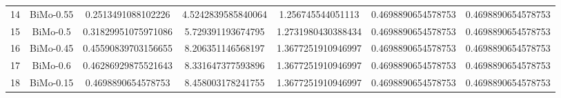 \documentclass[a4paper,10pt]{article}
\begin{document}
\begin{landscape}
\begin{table}[!htp]
\begin{tabular}{ccccccc}
14&BiMo-0.55&0.2513491088102226&4.5242839585840064&1.256745544051113&0.4698890654578753&0.4698890654578753\\
15&BiMo-0.5&0.31829951075971086&5.729391193674795&1.2731980430388434&0.4698890654578753&0.4698890654578753\\
16&BiMo-0.45&0.45590839703156655&8.206351146568197&1.3677251910946997&0.4698890654578753&0.4698890654578753\\
17&BiMo-0.6&0.46286929875521643&8.331647377593896&1.3677251910946997&0.4698890654578753&0.4698890654578753\\
18&BiMo-0.15&0.4698890654578753&8.458003178241755&1.3677251910946997&0.4698890654578753&0.4698890654578753\\
\hline
\end{tabular}
\end{table}


\end{landscape}
\end{document}
